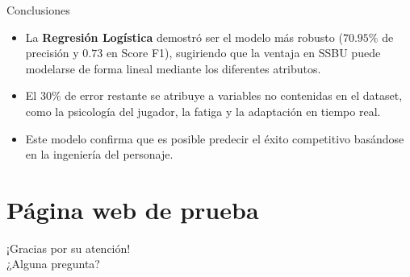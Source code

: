 \documentclass[xcolor=dvipsnames]{beamer}
\begin{document}
	\begin{frame}{Conclusiones}
	\begin{itemize}
		\item La \textbf{Regresión Logística} demostró ser el modelo más robusto ($70.95\%$ de precisión y $0.73$ en Score F1), sugiriendo que la ventaja en SSBU puede modelarse de forma lineal mediante los diferentes atributos.
		\item El $30\%$ de error restante se atribuye a variables no contenidas en el dataset, como la psicología del jugador, la fatiga y la adaptación en tiempo real.
		\item Este modelo confirma que es posible predecir el éxito competitivo basándose en la ingeniería del personaje.
	\end{itemize}
	\end{frame}
	
	\section{Página web de prueba}
	
	\begin{frame}[standout]
	¡Gracias por su atención! \\
	\vspace{1em}
	\footnotesize{¿Alguna pregunta?}
	\end{frame}
	
\end{document}
